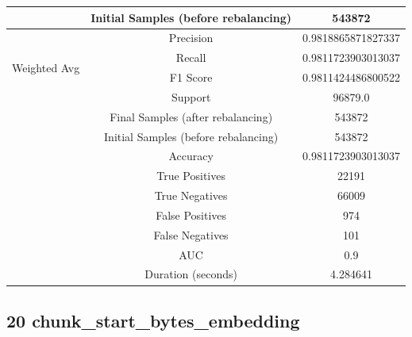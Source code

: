 \begin{longtable}{|c|c|c|}
 & Initial Samples (before rebalancing) & 543872 \\
\hline
\multirow{4}{*}{Weighted Avg} & Precision & 0.9818865871827337 \\
 & Recall & 0.9811723903013037 \\
 & F1 Score & 0.9811424486800522 \\
 & Support & 96879.0 \\
 & Final Samples (after rebalancing) & 543872 \\
 & Initial Samples (before rebalancing) & 543872 \\
\hline
& Accuracy & 0.9811723903013037 \\ \hline
& True Positives & 22191 \\ \hline
& True Negatives & 66009 \\ \hline
& False Positives & 974 \\ \hline
& False Negatives & 101 \\ \hline
& AUC & 0.9 \\ \hline
& Duration (seconds) & 4.284641 \\ \hline
\end{longtable}


\subsection{20 chunk\_start\_bytes\_embedding}

